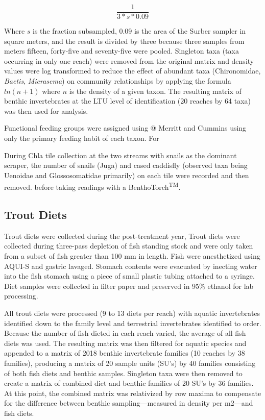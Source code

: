 \documentclass[double,12pt]{beavtex}
\begin{document}
  \begin{equation}
  \frac{1}{3*s*0.09}
  \end{equation}
  
  Where \(s\) is the fraction subsampled, 0.09 is the area of the Surber
  sampler in square meters, and the result is divided by three because
  three samples from meters fifteen, forty-five and seventy-five were
  pooled. Singleton taxa (taxa occurring in only one reach) were removed
  from the original matrix and density values were log transformed to
  reduce the effect of abundant taxa (Chironomidae, \emph{Baetis},
  \emph{Micrasema}) on community relationships by applying the formula
  \(ln(n + 1)\) where \(n\) is the density of a given taxon. The resulting
  matrix of benthic invertebrates at the LTU level of identification (20
  reaches by 64 taxa) was then used for analysis.
  
  Functional feeding groups were assigned using @ Merritt and Cummins
  using only the primary feeding habit of each taxon. For
  
  During Chla tile collection at the two streams with snails as the
  dominant scraper, the number of snails (Juga) and cased caddisfly
  (observed taxa being Uenoidae and Glossosomatidae primarily) on each
  tile were recorded and then removed. before taking readings with a
  BenthoTorch\textsuperscript{TM}.
  
  \subsection*{Trout Diets}\label{trout-diets}
  
  Trout diets were collected during the post-treatment year, Trout diets
  were collected during three-pass depletion of fish standing stock and
  were only taken from a subset of fish greater than 100 mm in length.
  Fish were anesthetized using AQUI-S and gastric lavaged. Stomach
  contents were evacuated by inecting water into the fish stomach using a
  piece of small plastic tubing attached to a syringe. Diet samples were
  collected in filter paper and preserved in 95\% ethanol for lab
  processing.
  
  All trout diets were processed (9 to 13 diets per reach) with aquatic
  invertebrates identified down to the family level and terrestrial
  invertebrates identified to order. Because the number of fish dieted in
  each reach varied, the average of all fish diets was used. The resulting
  matrix was then filtered for aquatic species and appended to a matrix of
  2018 benthic invertebrate families (10 reaches by 38 families),
  producing a matrix of 20 sample units (SU's) by 40 families consisting
  of both fish diets and benthic samples. Singleton taxa were then removed
  to create a matrix of combined diet and benthic families of 20 SU's by
  36 families. At this point, the combined matrix was relativized by row
  maxima to compensate for the difference between benthic
  sampling---measured in density per m2---and fish diets.
  
\end{document}
